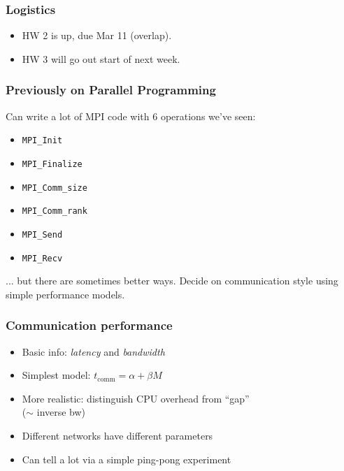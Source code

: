 \documentclass{beamer}
\begin{document}
\begin{frame}
  \titlepage
\end{frame}


\begin{frame}
  \frametitle{Logistics}

  \begin{itemize}
  \item HW 2 is up, due Mar 11 (overlap).
  \item HW 3 will go out start of next week.
  \end{itemize}
\end{frame}


\begin{frame}
  \frametitle{Previously on Parallel Programming}

  Can write a lot of MPI code with 6 operations we've seen:
  \begin{itemize}
  \item {\tt MPI\_Init}
  \item {\tt MPI\_Finalize}
  \item {\tt MPI\_Comm\_size}
  \item {\tt MPI\_Comm\_rank}
  \item {\tt MPI\_Send}
  \item {\tt MPI\_Recv}
  \end{itemize}
  ... but there are sometimes better ways.  Decide on
  communication style using simple performance models.

\end{frame}


\begin{frame}
  \frametitle{Communication performance}

  \begin{itemize}
  \item Basic info: {\em latency} and {\em bandwidth}
  \item Simplest model: $t_{\mathrm{comm}} = \alpha + \beta M$
  \item More realistic: distinguish CPU overhead from ``gap'' \\
    ($\sim$ inverse bw)
  \item Different networks have different parameters
  \item Can tell a lot via a simple ping-pong experiment
  \end{itemize}

\end{frame}
\end{document}
